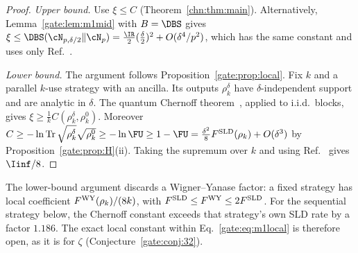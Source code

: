 \begin{proof}
\emph{Upper bound.} Use $\xi\le\hat C$ (Theorem~\ref{chn:thm:main}). Alternatively, Lemma~\ref{gate:lem:m1mid} with $B=\DBS$ gives $\xi\le\DBS(\cN_{p,\delta/2}\|\cN_p)=\frac{\IR}{2}(\frac\delta2)^2+O(\delta^4/p^2)$, which has the same constant and uses only Ref.~\cite{FangFawzi2021}.

\emph{Lower bound.} The argument follows Proposition~\ref{gate:prop:local}. Fix $k$ and a parallel $k$-use strategy with an ancilla. Its outputs $\rho_k^\delta$ have $\delta$-independent support and are analytic in $\delta$. The quantum Chernoff theorem~\cite{AudenaertChernoff2007,NussbaumSzkola2009}, applied to i.i.d.\ blocks, gives $\xi\ge\frac1kC(\rho_k^\delta,\rho_k^0)$. Moreover $C\ge-\ln\Tr\sqrt{\rho_k^\delta}\sqrt{\rho_k^0}\ge-\ln\FU\ge1-\FU=\frac{\delta^2}{8}F^{\rm SLD}(\rho_k)+O(\delta^3)$ by Proposition~\ref{gate:prop:H}(ii). Taking the supremum over $k$ and using Ref.~\cite{ZhouJiang2021} gives $\Iinf/8$.
\end{proof}

The lower-bound argument discards a Wigner--Yanase factor: a fixed strategy has local coefficient $F^{\rm WY}(\rho_k)/(8k)$, with $F^{\rm SLD}\le F^{\rm WY}\le2F^{\rm SLD}$. For the sequential strategy below, the Chernoff constant exceeds that strategy's own SLD rate by a factor $1.186$. The exact local constant within Eq.~\eqref{gate:eq:m1local} is therefore open, as it is for $\zeta$ (Conjecture~\ref{gate:conj:32}).


